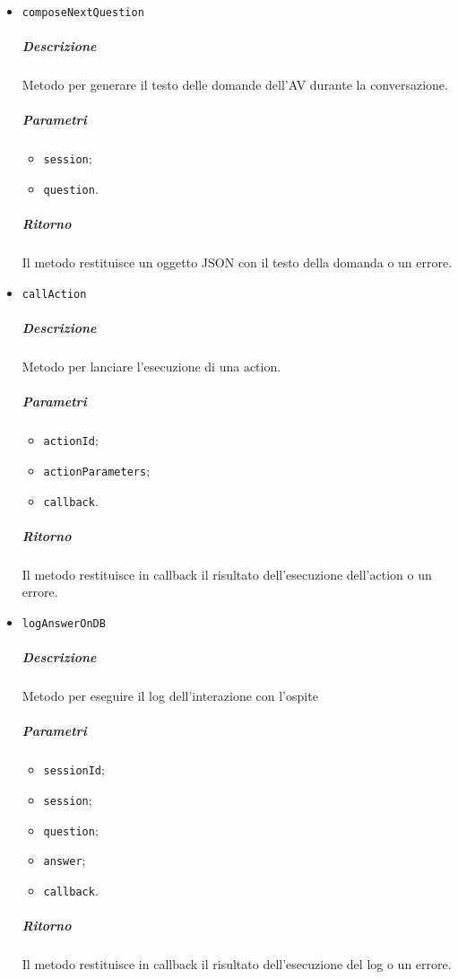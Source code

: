 \documentclass[../ManualeSviluppatore_v2.0.0.tex]{subfiles}
\begin{document}
\begin{itemize}
	\item \texttt{composeNextQuestion}
	      \subparagraph{Descrizione} Metodo per generare il testo delle domande dell'AV durante la conversazione.
	      \subparagraph{Parametri}
	      \begin{itemize}
	      	\item \texttt{session};
	      	\item \texttt{question}.
	      \end{itemize}
	      \subparagraph{Ritorno} Il metodo restituisce un oggetto JSON con il testo della domanda o un errore.

	\item \texttt{callAction}
	      \subparagraph{Descrizione} Metodo per lanciare l'esecuzione di una action.
	      \subparagraph{Parametri}
	      \begin{itemize}
	      	\item \texttt{actionId};
	      	\item \texttt{actionParameters};
	      	\item \texttt{callback}.
	      \end{itemize}
	      \subparagraph{Ritorno} Il metodo restituisce in callback il risultato dell'esecuzione dell'action o un errore.

	\item \texttt{logAnswerOnDB}
	      \subparagraph{Descrizione} Metodo per eseguire il log dell'interazione con l'ospite
	      \subparagraph{Parametri}
	      \begin{itemize}
	      	\item \texttt{sessionId};
	      	\item \texttt{session};
	      	\item \texttt{question};
	      	\item \texttt{answer};
	      	\item \texttt{callback}.
	      \end{itemize}
	      \subparagraph{Ritorno} Il metodo restituisce in callback il risultato dell'esecuzione del log o un errore.

\end{itemize}
\end{document}
